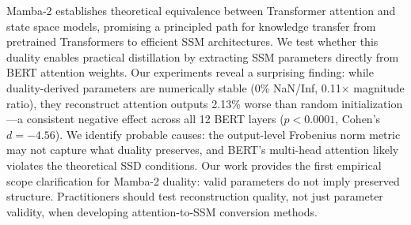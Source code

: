 Mamba-2 establishes theoretical equivalence between Transformer attention and state space models, promising a principled path for knowledge transfer from pretrained Transformers to efficient SSM architectures. We test whether this duality enables practical distillation by extracting SSM parameters directly from BERT attention weights. Our experiments reveal a surprising finding: while duality-derived parameters are numerically stable (0\% NaN/Inf, 0.11$\times$ magnitude ratio), they reconstruct attention outputs 2.13\% worse than random initialization---a consistent negative effect across all 12 BERT layers ($p < 0.0001$, Cohen's $d = -4.56$). We identify probable causes: the output-level Frobenius norm metric may not capture what duality preserves, and BERT's multi-head attention likely violates the theoretical SSD conditions. Our work provides the first empirical scope clarification for Mamba-2 duality: valid parameters do not imply preserved structure. Practitioners should test reconstruction quality, not just parameter validity, when developing attention-to-SSM conversion methods.
